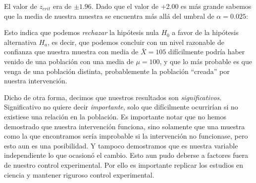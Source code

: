 \documentclass[a4paper,12pt]{article}
\begin{document}
El valor de $z_{crit}$ era de $\pm 1{.}96$. Dado que el valor de +2.00 es más grande sabemos que la media de nuestra muestra se encuentra más allá del umbral de $\alpha = 0{.}025$:

\begin{figure}[!ht]
  \begin{center}
  \end{center}
\end{figure}

Esto indica que podemos {\slshape rechazar} la hipótesis nula $H_{0}$ a favor de la hipótesis alternativa $H_{a}$, es decir, que podemos concluir con un nivel razonable de confianza que nuestra muestra con media de $\bar{X} = 105$ difícilmente podría haber venido de una población con una media de $\mu = 100$, y que lo más probable es que venga de una población distinta, probablemente la población ``creada'' por nuestra intervención.

Dicho de otra forma, decimos que nuestros resultados son {\slshape significativos}. Significativo no quiere decir {\slshape importante}, solo que difícilmente ocurrirían si no existiese una relación en la población. Es importante notar que no hemos demostrado que nuestra intervención funciona, sino solamente que una muestra como la que encontramos sería improbable si la intervención no funcionase, pero esto aun es una posibilidad. Y tampoco demostramos que es nuestra variable independiente lo que ocasionó el cambio. Esto aun pudo deberse a factores fuera de nuestro control experimental. Por ello es importante replicar los estudios en ciencia y mantener riguroso control experimental.
\end{document}
